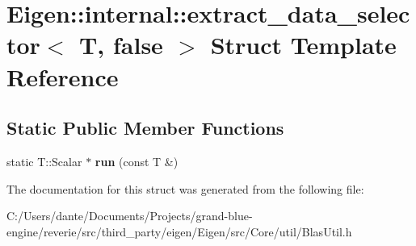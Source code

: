 \hypertarget{struct_eigen_1_1internal_1_1extract__data__selector_3_01_t_00_01false_01_4}{}\section{Eigen\+::internal\+::extract\+\_\+data\+\_\+selector$<$ T, false $>$ Struct Template Reference}
\label{struct_eigen_1_1internal_1_1extract__data__selector_3_01_t_00_01false_01_4}
\subsection*{Static Public Member Functions}
\begin{DoxyCompactItemize}
\item 
\mbox{\label{struct_eigen_1_1internal_1_1extract__data__selector_3_01_t_00_01false_01_4_a6ec6fde1bf0c2368ca1c72ba6bdb0fb7}} 
static T\+::\+Scalar $\ast$ {\bfseries run} (const T \&)
\end{DoxyCompactItemize}


The documentation for this struct was generated from the following file\+:\begin{DoxyCompactItemize}
\item 
C\+:/\+Users/dante/\+Documents/\+Projects/grand-\/blue-\/engine/reverie/src/third\+\_\+party/eigen/\+Eigen/src/\+Core/util/Blas\+Util.\+h\end{DoxyCompactItemize}
